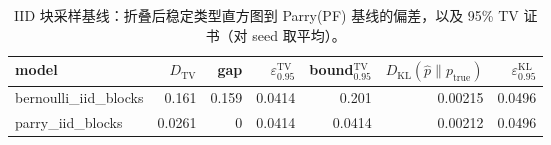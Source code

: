 \begin{table}[H]
\centering
\scriptsize
\setlength{\tabcolsep}{4pt}
\caption{IID 块采样基线：折叠后稳定类型直方图到 Parry(PF) 基线的偏差，以及 95\% TV 证书（对 seed 取平均）。}
\label{tab:iid_sources_fold_vs_parry_ci}
\begin{tabular}{lrrrrrr}
\toprule
model & $D_\mathrm{TV}$ & gap & $\varepsilon^{\mathrm{TV}}_{0.95}$ & bound$^{\mathrm{TV}}_{0.95}$ & $D_\mathrm{KL}(\hat p\|p_{\mathrm{true}})$ & $\varepsilon^{\mathrm{KL}}_{0.95}$\\
\midrule
bernoulli\_iid\_blocks & 0.161 & 0.159 & 0.0414 & 0.201 & 0.00215 & 0.0496\\
parry\_iid\_blocks & 0.0261 & 0 & 0.0414 & 0.0414 & 0.00212 & 0.0496\\
\bottomrule
\end{tabular}
\end{table}
